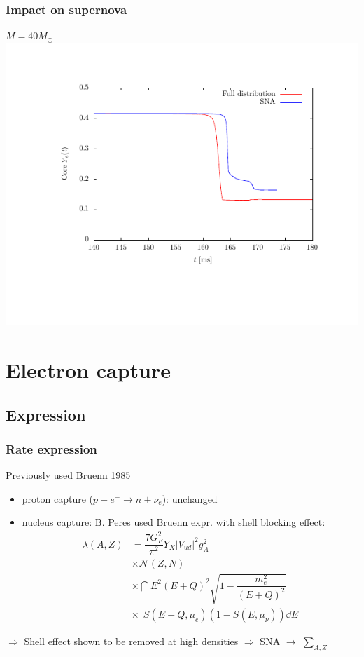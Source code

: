 \documentclass{beamer}
\begin{document}
\begin{frame}
\frametitle{Impact on supernova}
$M = \textrm{40} M_{\odot}$
\vspace{-3em}
\includegraphics[width=1.1\textwidth]{plots/y_e.pdf}
\end{frame}

\section{Electron capture}

\subsection{Expression}

\begin{frame}
\frametitle{Rate expression}

Previously used Bruenn 1985\cite{bruenn}

\begin{itemize}
\item proton capture ($p+e^{-}\to n+\nu_e$): unchanged
\item nucleus capture: B. Peres used Bruenn expr. with shell blocking effect: 
\begin{align*}
\lambda(A,Z) & = \dfrac{7G_F^2}{\pi^2}Y_X |V_{ud}|^2 g_A^2\\
& \times \mathcal{N}(Z,N)\\
& \times \dint E^2(E+Q)^2 \sqrt{1-\dfrac{m_e^2}{(E+Q)^2}} \\
& \times \ \ S(E+Q,\mu_e) (1-S(E,\mu_{\nu})) \dd E
\end{align*}
\end{itemize}

$\Longrightarrow$ Shell effect shown to be removed at high densities
\newline
$\Longrightarrow$ SNA $\to$ $\sum_{A,Z}$

\end{frame}
\end{document}
